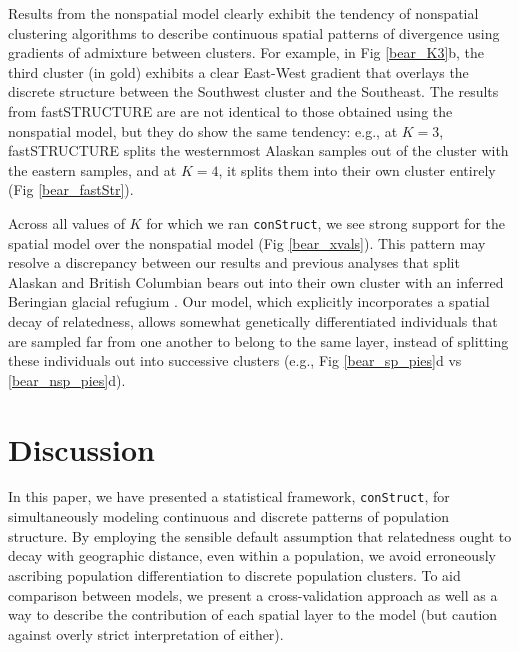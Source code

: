 \documentclass[10pt,letterpaper]{article}
\begin{document}
Results from the nonspatial model clearly exhibit the tendency 
of nonspatial clustering algorithms to describe continuous spatial patterns of divergence 
using gradients of admixture between clusters.
For example, in Fig \ref{bear_K3}b, 
the third cluster (in gold) exhibits a clear East-West gradient that 
overlays the discrete structure between the Southwest cluster and the Southeast.
The results from fastSTRUCTURE are are not identical to 
those obtained using the nonspatial model, 
but they do show the same tendency: 
e.g., at $K=3$, fastSTRUCTURE splits the westernmost Alaskan samples 
out of the cluster with the eastern samples, 
and at $K=4$, it splits them into their own cluster entirely (Fig \ref{bear_fastStr}).

Across all values of $K$ for which we ran \texttt{conStruct},
we see strong support for the spatial model over the nonspatial model (Fig \ref{bear_xvals}).
This pattern may resolve a discrepancy between our results and 
previous analyses that split Alaskan and British Columbian bears out 
into their own cluster with an inferred Beringian glacial refugium
\cite{Byun1997,Stone2000,Puckett2015}.
Our model, which explicitly incorporates a spatial decay of relatedness, 
allows somewhat genetically differentiated individuals 
that are sampled far from one another to belong to the same layer,
instead of splitting these individuals out into successive clusters 
(e.g., Fig \ref{bear_sp_pies}d vs \ref{bear_nsp_pies}d).

\section*{Discussion}


In this paper, we have presented a statistical framework, \texttt{conStruct}, for simultaneously 
modeling continuous and discrete patterns of population structure.
By employing the sensible default assumption
that relatedness ought to decay with geographic distance, even within a population, 
we avoid erroneously ascribing population differentiation to discrete population clusters.
To aid comparison between models,
we present a cross-validation approach 
as well as a way to describe the contribution of each spatial layer to the model
(but caution against overly strict interpretation of either).
\end{document}
